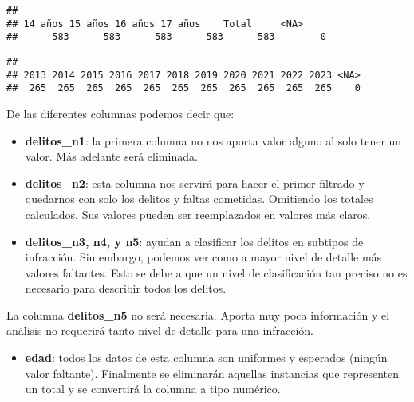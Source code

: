 \documentclass[,,,,pdftex]{Definitions/mdpi}
\newenvironment{Shaded}{\begin{snugshade}}{\end{snugshade}}
\newcommand{\AttributeTok}[1]{\textcolor[rgb]{0.13,0.29,0.53}{#1}}
\newcommand{\CommentTok}[1]{\textcolor[rgb]{0.56,0.35,0.01}{\textit{#1}}}
\newcommand{\FunctionTok}[1]{\textcolor[rgb]{0.13,0.29,0.53}{\textbf{#1}}}
\newcommand{\NormalTok}[1]{#1}
\newcommand{\SpecialCharTok}[1]{\textcolor[rgb]{0.81,0.36,0.00}{\textbf{#1}}}
\newcommand{\StringTok}[1]{\textcolor[rgb]{0.31,0.60,0.02}{#1}}
\providecommand{\tightlist}{%
  \setlength{\itemsep}{0pt}\setlength{\parskip}{0pt}}
\begin{document}
\begin{verbatim}
## 
## 14 años 15 años 16 años 17 años    Total     <NA> 
##      583      583      583      583      583        0
\end{verbatim}

\begin{Shaded}
\end{Shaded}

\begin{verbatim}
## 
## 2013 2014 2015 2016 2017 2018 2019 2020 2021 2022 2023 <NA> 
##  265  265  265  265  265  265  265  265  265  265  265    0
\end{verbatim}

De las diferentes columnas podemos decir que:

\begin{itemize}
\tightlist
\item
  \textbf{delitos\_n1}: la primera columna no nos aporta valor alguno al
  solo tener un valor. Más adelante será eliminada.
\item
  \textbf{delitos\_n2}: esta columna nos servirá para hacer el primer
  filtrado y quedarnos con solo los delitos y faltas cometidas.
  Omitiendo los totales calculados. Sus valores pueden ser reemplazados
  en valores más claros.
\item
  \textbf{delitos\_n3, n4, y n5}: ayudan a clasificar los delitos en
  subtipos de infracción. Sin embargo, podemos ver como a mayor nivel de
  detalle más valores faltantes. Esto se debe a que un nivel de
  clasificación tan preciso no es necesario para describir todos los
  delitos.
\end{itemize}

La columna \textbf{delitos\_n5} no será necesaria. Aporta muy poca
información y el análisis no requerirá tanto nivel de detalle para una
infracción.

\begin{itemize}
\tightlist
\item
  \textbf{edad}: todos los datos de esta columna son uniformes y
  esperados (ningún valor faltante). Finalmente se eliminarán aquellas
  instancias que representen un total y se convertirá la columna a tipo
  numérico.
\end{itemize}
\end{document}
